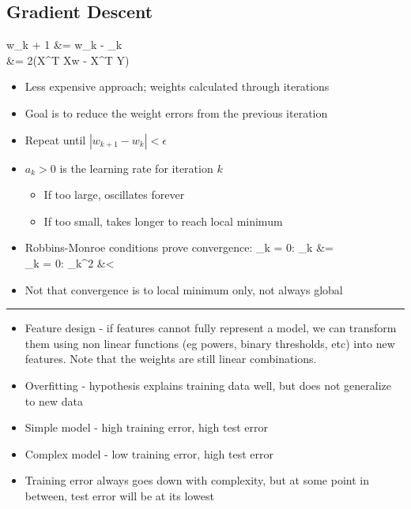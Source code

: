 \documentclass[12pt]{article}
\newcommand{\abs}[1]{\left|#1\right|}
\newcommand{\divider}[0]{\par\textcolor{lightgray}{\rule{\textwidth}{0.1pt}}}
\newenvironment{eqn}{\equation\alignedat{3}}{\endalignedat\endequation}
\begin{document}
\subsection{Gradient Descent}

\begin{eqn}
	w_{k + 1} &= w_k - \alpha_k  \\
	 &= 2(X^T Xw - X^T Y)
\end{eqn}
\begin{itemize}
	\item Less expensive approach; weights calculated through iterations
	\item Goal is to reduce the weight errors from the previous iteration
	\item Repeat until $\abs{w_{k + 1} - w_k} < \epsilon$
	\item $a_k > 0$ is the learning rate for iteration $k$
	\begin{itemize}
		\item If too large, oscillates forever
		\item If too small, takes longer to reach local minimum
	\end{itemize}
	\item Robbins-Monroe conditions prove convergence:
	\begin{eqn}
		\Sigma_{k = 0:\infty} \alpha_k &= \infty  \\
		\Sigma_{k = 0:\infty} \alpha_k^2 &< \infty
	\end{eqn}
	\item Not that convergence is to local minimum only, not always global
\end{itemize}

\divider

\begin{itemize}
	\item Feature design - if features cannot fully represent a model, we can transform them using non linear functions (eg powers, binary thresholds, etc) into new features. Note that the weights are still linear combinations.
	\item Overfitting - hypothesis explains training data well, but does not generalize to new data
	\item Simple model - high training error, high test error 
	\item Complex model - low training error, high test error 
	\item Training error always goes down with complexity, but at some point in between, test error will be at its lowest
\end{itemize}
\end{document}
